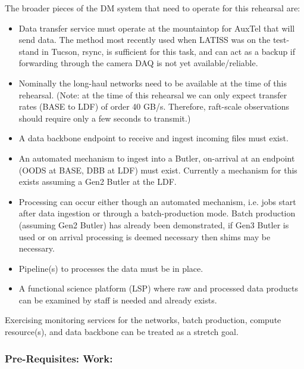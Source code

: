 The broader pieces of the DM system that need to operate for this rehearsal are:
\begin{itemize}[topsep=-8pt]
\item Data transfer service must operate at the mountaintop for AuxTel that will send data.
The method most recently used when LATISS was on the test-stand in Tucson, rsync, is 
sufficient for this task, and can act as a backup if forwarding through the camera DAQ is 
not yet available/reliable.

\item  Nominally the long-haul networks need to be available at the time of this rehearsal.
(Note: at the time of this rehearsal we can only expect transfer rates (BASE to LDF)
of order 40 GB/s.  Therefore, raft-scale observations should require only a few seconds to 
transmit.)

\item A data backbone endpoint to receive and ingest incoming files must exist.

\item An automated mechanism to ingest into a Butler, on-arrival at an endpoint (OODS at BASE, DBB at LDF)
must exist.  Currently a mechanism for this exists assuming a Gen2 Butler at the LDF.

\item Processing can occur either though an automated mechanism, i.e. jobs start after data ingestion
or through a batch-production mode.  Batch production (assuming Gen2 Butler) has already been demonstrated,
if Gen3 Butler is used or on arrival processing is deemed necessary then shims may be necessary.

\item Pipeline(s) to processes the data must be in place.

\item A functional science platform (LSP) where raw and processed data products can be 
examined by staff is needed and already exists.
\end{itemize}

Exercising monitoring services for the networks, batch production, compute 
resource(s), and data backbone can be treated as a stretch goal.


\subsubsection{Pre-Requisites: Work:}\label{prework}


